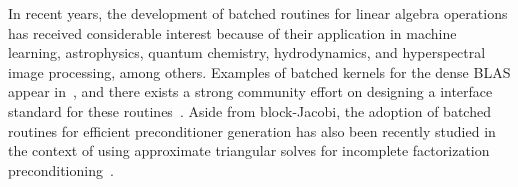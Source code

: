 In recent years, 
the development of batched routines for linear algebra
operations has received considerable interest
because of their {application in}
machine learning, astrophysics, quantum
chemistry, hydrodynamics, and hyperspectral image processing, among others.
Examples of batched 
kernels for the dense BLAS appear in~\cite{7275187,Haidar:2015:BMC:2766466.2766470},
and there exists a strong community effort on designing a interface standard for these routines~\cite{bblas}.
Aside from block-Jacobi, the {adoption} of batched routines for efficient
preconditioner generation has also
been recently studied in the context of using approximate triangular solves for
incomplete factorization preconditioning~\cite{scala2016,Anzt:2017:BGE:3026937.3026940}.

